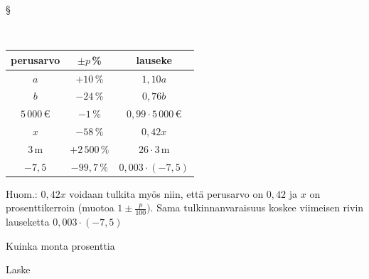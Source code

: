 \begin{tehtavasivu}
\begin{tehtava}
\begin{vastaus}
{§ \begin{scriptsize} \begin{tabular}{|c|c|c|}
\hline 
perusarvo & $\pm p$\,\% & lauseke \\ 
\hline 
$a$ & $+10$\,\% & $1,10a$ \\ 
\hline 
$b$ & $-24$\,\% &$0,76b$ \\ 
\hline 
$5\,000$\,€ & $-1\,\%$ &$0,99\cdot5\,000\,$€ \\ 
\hline 
$x$ &$-58\,\%$ & $0,42x$ \\ 
\hline 
 $3$\,m&$+2\,500\,\%$ &$26\cdot3$\,m \\ 
 \hline
 $-7,5$ & $-99,7\,\%$ & $0,003\cdot(-7,5)$ \\
  \hline %
\end{tabular} \end{scriptsize}

Huom.: $0,42x$ voidaan tulkita myös niin, että perusarvo on $0,42$ ja $x$ on prosenttikerroin (muotoa $1\pm \frac{p}{100})$. Sama tulkinnanvaraisuus koskee viimeisen rivin lauseketta $0,003\cdot (-7,5)$
}
	\end{vastaus}
\end{tehtava}

\begin{tehtava}
    Kuinka monta prosenttia
    \begin{vastaus}
    \end{vastaus}
\end{tehtava}

\begin{tehtava}
    Laske
    \begin{vastaus}
    \end{vastaus}
\end{tehtava}


\end{tehtavasivu}
